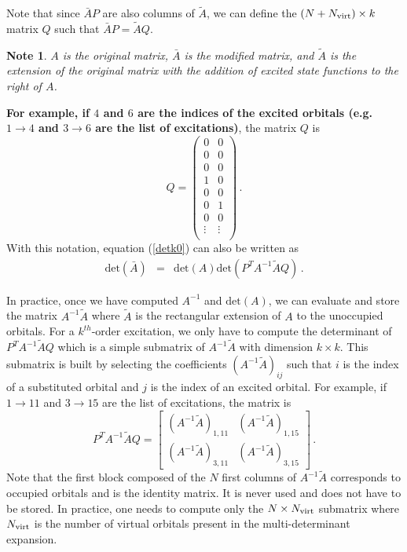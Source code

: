 \documentclass[aip,jcp,reprint,floatfix,onecolumn]{revtex4-1}
\newtheorem*{note}{Note}
\def\det{\text{det}}
\def\A{A}
\def\aa{A^{-1}\tilde{A}}
\begin{document}
Note that since $\bar{A}P$  are also  columns of $\tilde{A}$, we can define the $(N+ N_{\rm virt})\times k$ matrix $Q$ such that $\bar{A}P = \tilde{A} Q$.

\begin{note}
  $A$ is the original matrix, $\bar A$ is the modified matrix, and $\widetilde{A}$ is the extension of the original matrix with the addition of excited state functions to the right of $A$.
\end{note}

{\bf For example, if $4$ and $6$ are the indices of the excited orbitals (e.g. $1 \to 4$ and $3 \to 6$ are the list of excitations)}, the matrix $Q$ is
\begin{equation}
Q = \left( \begin{array}{cccccc}
0 & 0  \\
0 & 0  \\
0 & 0  \\
1 & 0  \\
0 & 0  \\
0 & 1  \\
0 & 0  \\
\vdots & \vdots \\
\end{array} \right)\,.
\end{equation}
With this notation, equation (\ref{detk0}) can also be written as
\begin{eqnarray}
\det (\bar{\A})  & = & \det (\A)  \det (P^T \A^{-1} \tilde{\A} Q) \,.
\label{detk}
\end{eqnarray}

In practice,  once we have  computed $\A^{-1}$ and $\det(A)$, we can evaluate and store the matrix   $\A^{-1} \tilde{A}$ where $\tilde{A}$ is the rectangular extension of $A$ to the unoccupied orbitals.
For a $k^{th}$-order excitation, we only have to compute the determinant of
 $P^T \A^{-1}  \tilde{\A}Q$ which is a simple submatrix of $A^{-1}\tilde{A}$ with  dimension $k\times k$. This submatrix is built
by selecting the coefficients $(\aa)_{ij}$ such that   $i$ is the index of  a substituted orbital and $j$ is the index of an excited orbital.
For example, if $1 \to 11$ and $3 \to 15$ are the list of excitations,
the matrix is
\begin{equation}
P^T A^{-1}\tilde{A}Q = \left[\begin{matrix} (\aa)_{1,11} & (\aa)_{1,15}   \\
                      (\aa)_{3,11} & (\aa)_{3,15}
\end{matrix} \right]\,.
\end{equation}
Note that the first block composed of the $N$ first columns of $\A^{-1} \tilde{A}$ corresponds to occupied orbitals and is the identity matrix. It is never used and does not have to be stored. In practice, one needs to compute only the $N\times N_{\rm virt}$ submatrix where $N_{\rm virt}$ is the number of virtual orbitals present in the multi-determinant expansion.
\end{document}
